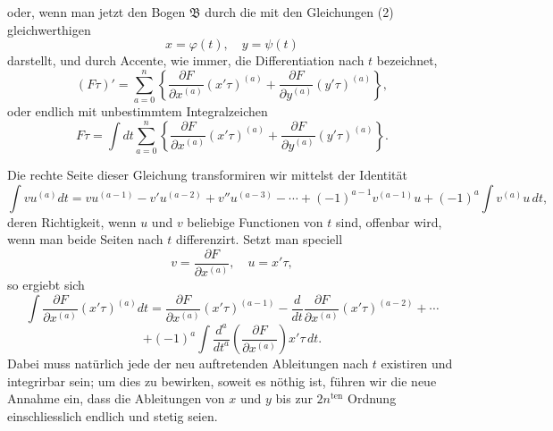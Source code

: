 \documentclass[11pt,a4paper,leqno]{article}
\begin{document}
oder, wenn man jetzt den Bogen $\mathfrak B$ durch die mit den Gleichungen (2) gleichwerthigen
\[
x=\varphi(t),\quad y=\psi(t)
\]
darstellt, und durch Accente, wie immer, die Differentiation nach $t$ bezeichnet,
\[
(F\tau)'=\sum_{a=0}^n\left\{\frac{\partial F}{\partial x^{(a)}}(x'\tau)^{(a)}+\frac{\partial F}{\partial y^{(a)}}(y'\tau)^{(a)}\right\},
\]
oder endlich mit unbestimmtem Integralzeichen
\begin{equation}\tag{3}
F\tau=\int dt\sum_{a=0}^n\left\{\frac{\partial F}{\partial x^{(a)}}(x'\tau)^{(a)}+\frac{\partial F}{\partial y^{(a)}}(y'\tau)^{(a)}\right\}.
\end{equation}

Die rechte Seite dieser Gleichung transformiren wir mittelst der Identität
\[
\int vu^{(a)}dt=vu^{(a-1)}-v'u^{(a-2)}+v''u^{(a-3)}-\cdots
+(-1)^{a-1}v^{(a-1)}u+(-1)^a\int v^{(a)}u\,dt,
\]
deren Richtigkeit, wenn $u$ und $v$ beliebige Functionen von $t$ sind, offenbar wird, wenn man beide Seiten nach $t$ differenzirt. Setzt man speciell
\[
v=\frac{\partial F}{\partial x^{(a)}},\quad u=x'\tau,
\]
so ergiebt sich
\[
\int\frac{\partial F}{\partial x^{(a)}}(x'\tau)^{(a)}dt
=\frac{\partial F}{\partial x^{(a)}}(x'\tau)^{(a-1)}
-\frac{d}{dt}\frac{\partial F}{\partial x^{(a)}}(x'\tau)^{(a-2)}+\cdots
\]
\[
+(-1)^a\int\frac{d^a}{dt^a}\left(\frac{\partial F}{\partial x^{(a)}}\right)x'\tau\,dt.
\]
Dabei muss natürlich jede der neu auftretenden Ableitungen nach $t$ existiren und integrirbar sein; um dies zu bewirken, soweit es nöthig ist, führen wir die neue Annahme ein, dass die Ableitungen von $x$ und $y$ bis zur $2n^{\mathrm{ten}}$ Ordnung einschliesslich endlich und stetig seien.
\end{document}
